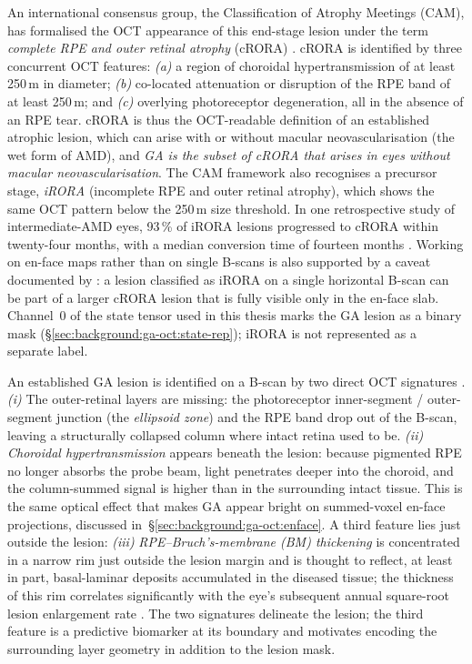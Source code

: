 An international consensus group, the Classification of Atrophy
Meetings (CAM), has formalised the OCT appearance of this end-stage
lesion under the term \emph{complete RPE and outer retinal atrophy}
(cRORA) \citep{Sadda2018, Vallino2024}. cRORA is identified by three concurrent
OCT features: \emph{(a)} a region of choroidal hypertransmission of at
least 250\,\textmu{}m in diameter; \emph{(b)} co-located attenuation or
disruption of the RPE band of at least 250\,\textmu{}m; and \emph{(c)}
overlying photoreceptor degeneration, all in the absence of an RPE tear.
cRORA is thus the OCT-readable definition of an established
atrophic lesion, which can arise with or without macular neovascularisation
(the wet form of AMD), and \emph{GA is the subset of cRORA that
arises in eyes without macular neovascularisation}. The CAM framework
also recognises a precursor stage, \emph{iRORA} (incomplete RPE and
outer retinal atrophy), which shows the same OCT pattern below the
250\,\textmu{}m size threshold. In one retrospective study of
intermediate-AMD eyes, 93\,\% of iRORA lesions progressed to cRORA within
twenty-four months, with a median conversion time of fourteen months
\citep{Vallino2024}. Working on en-face maps rather than on single
B-scans is also supported by a caveat documented by \citet{Vallino2024}:
a lesion classified as iRORA on a single horizontal B-scan can be part of
a larger cRORA lesion that is fully visible only in the en-face slab.
Channel~0 of
the state tensor used in this thesis marks the GA lesion as a binary
mask (\S\ref{sec:background:ga-oct:state-rep}); iRORA is not represented
as a separate label.

An established GA lesion is identified on a B-scan by two direct OCT
signatures \citep{Boopathiraj2024,Yehoshua2011,Vallino2024}.
\emph{(i)} The outer-retinal layers are missing: the photoreceptor
inner-segment / outer-segment junction (the \emph{ellipsoid zone}) and
the RPE band drop out of the B-scan, leaving a structurally collapsed
column where intact retina used to be.
\emph{(ii)} \emph{Choroidal hypertransmission} appears beneath the
lesion: because pigmented RPE no longer absorbs the probe beam, light
penetrates deeper into the choroid, and the column-summed signal is
higher than in the surrounding intact tissue. This is the same optical
effect that makes GA appear bright on summed-voxel en-face projections,
discussed in~\S\ref{sec:background:ga-oct:enface}.
A third feature lies just outside the lesion:
\emph{(iii)} \emph{RPE--Bruch's-membrane (BM) thickening} is
concentrated in a narrow rim just outside the lesion margin and is
thought to reflect, at
least in part, basal-laminar deposits accumulated in the diseased tissue;
the thickness of this rim correlates significantly with the eye's subsequent
annual square-root lesion enlargement rate \citep{Chu2022}.
The two signatures delineate the lesion; the third feature is a
predictive biomarker at its boundary and motivates
encoding the surrounding layer geometry in addition to the lesion mask.


